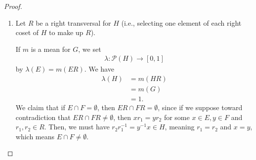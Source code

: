 \documentclass[10pt]{mypackage}
\begin{document}
\begin{proof}\hfill
  \begin{enumerate}[(1)]
    \item Let $R$ be a right transversal for $H$ (i.e., selecting one element of each right coset of $H$ to make up $R$).\newline

      If $m$ is a mean for $G$, we set
      \begin{align*}
        \lambda: \mathcal{P}\left(H\right) \rightarrow [0,1]
      \end{align*}
      by $\lambda(E) = m\left(ER\right)$. We have
      \begin{align*}
        \lambda\left(H\right) &= m\left(HR\right)\\
                              &= m\left(G\right)\\
                              &= 1.
      \end{align*}
      We claim that if $E\cap F = \emptyset$, then $ER\cap FR = \emptyset$, since if we suppose toward contradiction that $ER \cap FR \neq \emptyset$, then $xr_1 = yr_2$ for some $ x\in E,y\in F$ and $r_1,r_2\in R$. Then, we must have $r_2r_1^{-1} = y^{-1}x \in H$, meaning $r_1 = r_2$ and $x = y$, which means $E\cap F \neq \emptyset$.\newline


\end{enumerate}
\end{proof}
\end{document}
